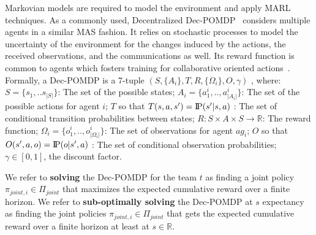\documentclass[runningheads]{llncs}
\newcommand{\probP}{\text{I\kern-0.15em P}}
\begin{document}
Markovian models are required to model the environment and apply MARL techniques. As a commonly used, Decentralized Dec-POMDP~\cite{Oliehoek2016} considers multiple agents in a similar MAS fashion. It relies on stochastic processes to model the uncertainty of the environment for the changes induced by the actions, the received observations, and the communications as well. Its reward function is common to agents which fosters training for collaborative oriented actions~\cite{Beynier2013}. Formally, a Dec-POMDP is a 7-tuple $(S,\{A_i\},T,R,\{\Omega_i\},O,\gamma)$ , where: $S = \{s_1, ..s_{|S|}\}$: The set of the possible states; $A_{i} = \{a_{1}^{i},..,a_{|A_{i}|}^{i}\}$: The set of the possible actions for agent $i$; $T$ so that $T(s,a,s') = \probP{(s'|s,a)}$ : The set of conditional transition probabilities between states; $R: S \times A \times S \rightarrow \mathbb{R}$: The reward function; $\Omega_{i} = \{o_{1}^{i},..,o_{|\Omega_{i}|}^{i}\}$: The set of observations for agent $ag_i$; $O$ so that $O(s',a,o) = \probP{(o|s',a)}$ : The set of conditional observation probabilities; $\gamma \in [0,1]$, the discount factor.

We refer to \textbf{solving} the Dec-POMDP for the team $t$ as finding a joint policy $\pi_{joint,i} \in \Pi_{joint}$ that maximizes the expected cumulative reward over a finite horizon.
We refer to \textbf{sub-optimally solving} the Dec-POMDP at $s$ expectancy as finding the joint policies $\pi_{joint,i} \in \Pi_{joint}$ that gets the expected cumulative reward over a finite horizon at least at $s \in \mathbb{R}$.


\end{document}
